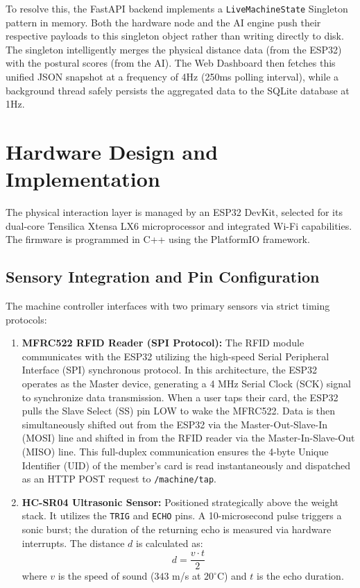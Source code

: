 \documentclass[conference]{IEEEtran}
\begin{document}
To resolve this, the FastAPI backend implements a \texttt{LiveMachineState} Singleton pattern in memory. Both the hardware node and the AI engine push their respective payloads to this singleton object rather than writing directly to disk. The singleton intelligently merges the physical distance data (from the ESP32) with the postural scores (from the AI). The Web Dashboard then fetches this unified JSON snapshot at a frequency of 4Hz (250ms polling interval), while a background thread safely persists the aggregated data to the SQLite database at 1Hz.

\section{Hardware Design and Implementation}
The physical interaction layer is managed by an ESP32 DevKit, selected for its dual-core Tensilica Xtensa LX6 microprocessor and integrated Wi-Fi capabilities. The firmware is programmed in C++ using the PlatformIO framework.

\subsection{Sensory Integration and Pin Configuration}
The machine controller interfaces with two primary sensors via strict timing protocols:
\begin{enumerate}
    \item \textbf{MFRC522 RFID Reader (SPI Protocol):} The RFID module communicates with the ESP32 utilizing the high-speed Serial Peripheral Interface (SPI) synchronous protocol. In this architecture, the ESP32 operates as the Master device, generating a 4 MHz Serial Clock (SCK) signal to synchronize data transmission. When a user taps their card, the ESP32 pulls the Slave Select (SS) pin LOW to wake the MFRC522. Data is then simultaneously shifted out from the ESP32 via the Master-Out-Slave-In (MOSI) line and shifted in from the RFID reader via the Master-In-Slave-Out (MISO) line. This full-duplex communication ensures the 4-byte Unique Identifier (UID) of the member's card is read instantaneously and dispatched as an HTTP POST request to \texttt{/machine/tap}.
    \item \textbf{HC-SR04 Ultrasonic Sensor:} Positioned strategically above the weight stack. It utilizes the \texttt{TRIG} and \texttt{ECHO} pins. A 10-microsecond pulse triggers a sonic burst; the duration of the returning echo is measured via hardware interrupts. The distance $d$ is calculated as:
    \begin{equation}
        d = \frac{v \cdot t}{2}
    \end{equation}
    where $v$ is the speed of sound ($343$ m/s at $20^\circ$C) and $t$ is the echo duration.
\end{enumerate}
\end{document}

